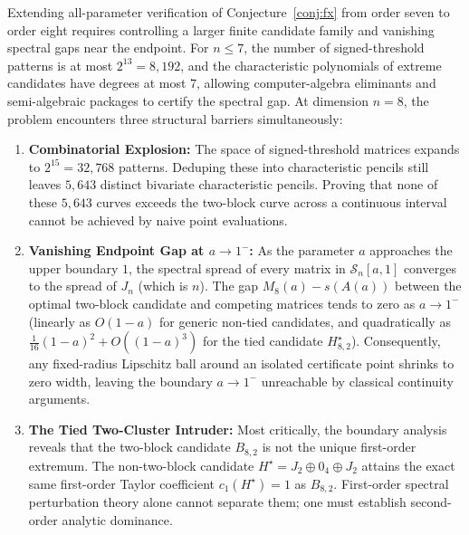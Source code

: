 \documentclass[11pt,reqno]{article}
\theoremstyle{definition}
\begin{document}
Extending all-parameter verification of Conjecture~\ref{conj:fx} from order seven to order eight requires controlling a larger finite candidate family and vanishing spectral gaps near the endpoint. For $n \le 7$, the number of signed-threshold patterns is at most $2^{13} = 8{,}192$, and the characteristic polynomials of extreme candidates have degrees at most $7$, allowing computer-algebra eliminants and semi-algebraic packages to certify the spectral gap. At dimension $n = 8$, the problem encounters three structural barriers simultaneously:
\begin{enumerate}
    \item \textbf{Combinatorial Explosion:} The space of signed-threshold matrices expands to $2^{15} = 32{,}768$ patterns. Deduping these into characteristic pencils still leaves $5{,}643$ distinct bivariate characteristic pencils. Proving that none of these $5{,}643$ curves exceeds the two-block curve across a continuous interval cannot be achieved by naive point evaluations.
    \item \textbf{Vanishing Endpoint Gap at $a \to 1^-$:} As the parameter $a$ approaches the upper boundary $1$, the spectral spread of every matrix in $\mathcal{S}_n[a, 1]$ converges to the spread of $J_n$ (which is $n$). The gap $M_8(a) - s(A(a))$ between the optimal two-block candidate and competing matrices tends to zero as $a \to 1^-$ (linearly as $O(1-a)$ for generic non-tied candidates, and quadratically as $\frac{1}{16}(1-a)^2 + O((1-a)^3)$ for the tied candidate $H^\star_{8, 2}$). Consequently, any fixed-radius Lipschitz ball around an isolated certificate point shrinks to zero width, leaving the boundary $a \to 1^-$ unreachable by classical continuity arguments.
    \item \textbf{The Tied Two-Cluster Intruder:} Most critically, the boundary analysis reveals that the two-block candidate $B_{8, 2}$ is not the unique first-order extremum. The non-two-block candidate $H^\star = J_2 \oplus 0_4 \oplus J_2$ attains the exact same first-order Taylor coefficient $c_1(H^\star) = 1$ as $B_{8, 2}$. First-order spectral perturbation theory alone cannot separate them; one must establish second-order analytic dominance.
\end{enumerate}
\end{document}
